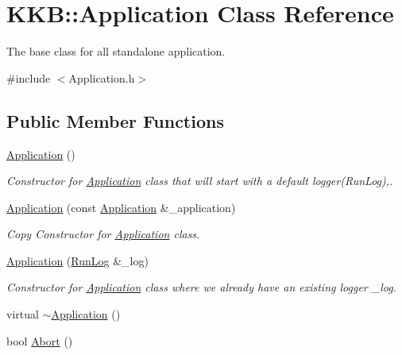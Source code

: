\hypertarget{class_k_k_b_1_1_application}{}\section{K\+KB\+:\+:Application Class Reference}
\label{class_k_k_b_1_1_application}


The base class for all standalone application.  




{\ttfamily \#include $<$Application.\+h$>$}

\subsection*{Public Member Functions}
\begin{DoxyCompactItemize}
\item 
\hyperlink{class_k_k_b_1_1_application_afa8cc05ce6b6092be5ecdfdae44e05f8}{Application} ()
\begin{DoxyCompactList}\small\item\em Constructor for \hyperlink{class_k_k_b_1_1_application}{Application} class that will start with a default logger(\+Run\+Log),. \end{DoxyCompactList}\item 
\hyperlink{class_k_k_b_1_1_application_abb04f6b0977ab2b56a8a9fc103d4c10c}{Application} (const \hyperlink{class_k_k_b_1_1_application}{Application} \&\+\_\+application)
\begin{DoxyCompactList}\small\item\em Copy Constructor for \hyperlink{class_k_k_b_1_1_application}{Application} class. \end{DoxyCompactList}\item 
\hyperlink{class_k_k_b_1_1_application_a6257863bb44308181024c7052b46285e}{Application} (\hyperlink{class_k_k_b_1_1_run_log}{Run\+Log} \&\+\_\+log)
\begin{DoxyCompactList}\small\item\em Constructor for \hyperlink{class_k_k_b_1_1_application}{Application} class where we already have an existing logger \textquotesingle{}\+\_\+log\textquotesingle{}. \end{DoxyCompactList}\item 
virtual \hyperlink{class_k_k_b_1_1_application_a748bca84fefb9c12661cfaa2f623748d}{$\sim$\+Application} ()
\item 
bool \hyperlink{class_k_k_b_1_1_application_a59170bc42be6423288b94948e1668560}{Abort} ()

\end{DoxyCompactItemize}
